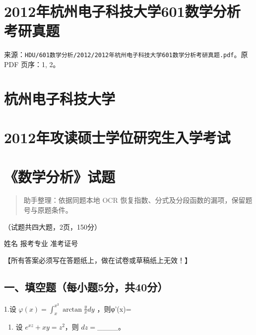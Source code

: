 \documentclass[11pt,fontset=fandol]{ctexart}
\providecommand{\tightlist}{\setlength{\itemsep}{0pt}\setlength{\parskip}{0pt}}
\begin{document}
\section{2012年杭州电子科技大学601数学分析考研真题}\label{ux5e74ux676dux5ddeux7535ux5b50ux79d1ux6280ux5927ux5b66601ux6570ux5b66ux5206ux6790ux8003ux7814ux771fux9898}

来源：\texttt{HDU/601数学分析/2012/2012年杭州电子科技大学601数学分析考研真题.pdf}。原
PDF 页序：1, 2。

\section{杭州电子科技大学}\label{ux676dux5ddeux7535ux5b50ux79d1ux6280ux5927ux5b66}

\section{2012年攻读硕士学位研究生入学考试}\label{ux5e74ux653bux8bfbux7855ux58ebux5b66ux4f4dux7814ux7a76ux751fux5165ux5b66ux8003ux8bd5}

\section{《数学分析》试题}\label{ux6570ux5b66ux5206ux6790ux8bd5ux9898}

\begin{quote}
助手整理：依据同题本地 OCR
恢复指数、分式及分段函数的漏项，保留题号与原题条件。
\end{quote}

（试题共四大题，2页，150分）

姓名 报考专业 准考证号

【所有答案必须写在答题纸上，做在试卷或草稿纸上无效！】

\subsection{一、填空题（每小题5分，共40分）}\label{ux4e00ux586bux7a7aux9898ux6bcfux5c0fux98985ux5206ux517140ux5206}

1.设
\(\varphi ( x ) = \int _ { x } ^ { x ^ { 3 } } \arctan { \frac { y } { x } } d y\)
，则φ'(x)=

\begin{enumerate}
\def\labelenumi{\arabic{enumi}.}
\setcounter{enumi}{1}
\tightlist
\item
  设 \(e^{xz}+xy=z^2\)，则 \(dz=\)\_\_\_\_。
\end{enumerate}
\end{document}
